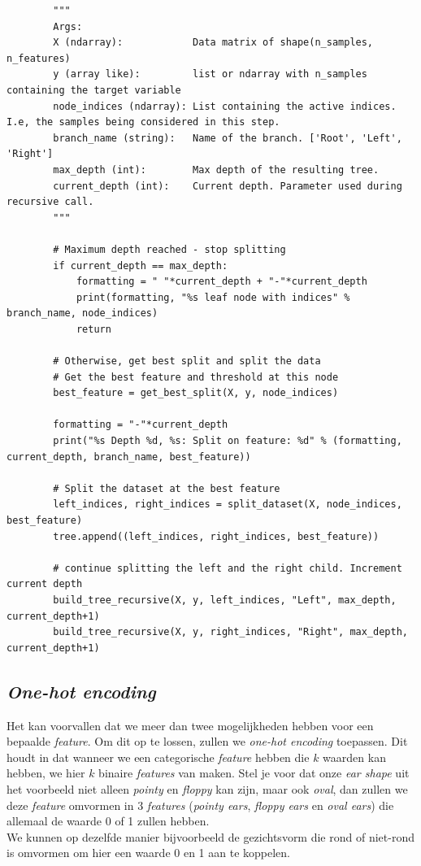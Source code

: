 \begin{lstlisting}
	    """
	    Args:
	    X (ndarray):            Data matrix of shape(n_samples, n_features)
	    y (array like):         list or ndarray with n_samples containing the target variable
	    node_indices (ndarray): List containing the active indices. I.e, the samples being considered in this step.
	    branch_name (string):   Name of the branch. ['Root', 'Left', 'Right']
	    max_depth (int):        Max depth of the resulting tree.
	    current_depth (int):    Current depth. Parameter used during recursive call.
	    """
	
	    # Maximum depth reached - stop splitting
	    if current_depth == max_depth:
	        formatting = " "*current_depth + "-"*current_depth
	        print(formatting, "%s leaf node with indices" % branch_name, node_indices)
	        return
	
	    # Otherwise, get best split and split the data
	    # Get the best feature and threshold at this node
	    best_feature = get_best_split(X, y, node_indices)
	
	    formatting = "-"*current_depth
	    print("%s Depth %d, %s: Split on feature: %d" % (formatting, current_depth, branch_name, best_feature))
	
	    # Split the dataset at the best feature
	    left_indices, right_indices = split_dataset(X, node_indices, best_feature)
	    tree.append((left_indices, right_indices, best_feature))
	
	    # continue splitting the left and the right child. Increment current depth
	    build_tree_recursive(X, y, left_indices, "Left", max_depth, current_depth+1)
	    build_tree_recursive(X, y, right_indices, "Right", max_depth, current_depth+1)
\end{lstlisting}

\subsection{\textit{One-hot encoding}}

Het kan voorvallen dat we meer dan twee mogelijkheden hebben voor een bepaalde \textit{feature}. Om dit op te lossen, zullen we \textit{one-hot encoding} toepassen. Dit houdt in dat wanneer we een categorische \textit{feature} hebben die $k$ waarden kan hebben, we hier $k$ binaire \textit{features} van maken. Stel je voor dat onze \textit{ear shape} uit het voorbeeld niet alleen \textit{pointy} en \textit{floppy} kan zijn, maar ook \textit{oval}, dan zullen we deze \textit{feature} omvormen in 3 \textit{features} (\textit{pointy ears}, \textit{floppy ears} en \textit{oval ears}) die allemaal de waarde 0 of 1 zullen hebben. \\
\newline
We kunnen op dezelfde manier bijvoorbeeld de gezichtsvorm die rond of niet-rond is omvormen om hier een waarde 0 en 1 aan te koppelen.
\newpage
